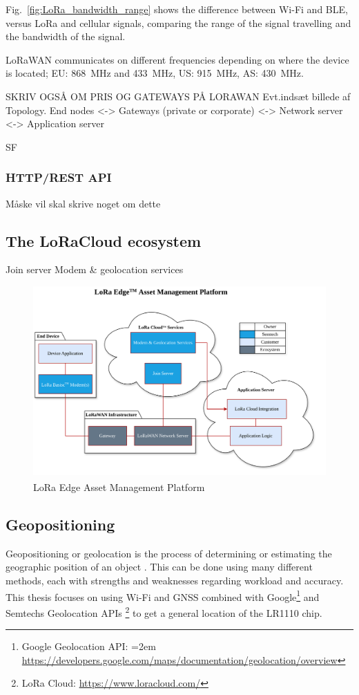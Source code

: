 Fig.~\ref{fig:LoRa_bandwidth_range} shows the difference between Wi-Fi and \ac{BLE}, versus \ac{LoRa} and cellular signals, comparing the range of the signal travelling and the bandwidth of the signal.

\ac{LoRaWAN} communicates on different frequencies depending on where the device is located; EU: \SI{868}{\mega\hertz} and \SI{433}{\mega\hertz}, US: \SI{915}{\mega\hertz}, AS: \SI{430}{\mega\hertz}.

SKRIV OGSÅ OM PRIS OG GATEWAYS PÅ LORAWAN
Evt.indsæt billede af Topology. End nodes <-> Gateways (private or corporate) <-> Network server <-> Application server

\ac{SF}

\subsubsection{HTTP/REST API}
Måske vil skal skrive noget om dette

\subsection{The LoRaCloud ecosystem}
Join server
Modem \& geolocation services

\begin{figure}[H]
    \centering
    \includegraphics[width=0.7\linewidth]{figures/LoRaCloud_interface.png}
    \caption{LoRa Edge\textsuperscript{\texttrademark} Asset Management Platform}
\end{figure}

\subsection{Geopositioning}
Geopositioning or geolocation is the process of determining or estimating the geographic position of an object \cite{ISO19130}. This can be done using many different methods, each with strengths and weaknesses regarding workload and accuracy. This thesis focuses on using Wi-Fi and \ac{GNSS} combined with Google\footnote{Google Geolocation API: \hangindent=2em \url{https://developers.google.com/maps/documentation/geolocation/overview}} and Semtechs Geolocation APIs \footnote{LoRa Cloud: \url{https://www.loracloud.com/}} to get a general location of the LR1110 chip.

